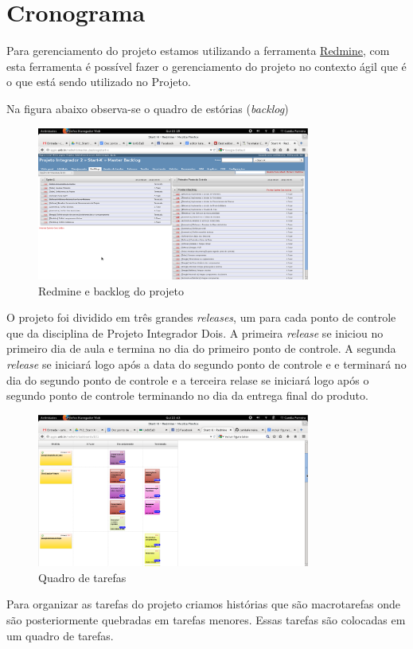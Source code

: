 \chapter[Cronograma]{Cronograma}

Para gerenciamento do projeto estamos utilizando a ferramenta \href{http://lappis.unb.br/redm}{Redmine}, com esta ferramenta é possível fazer o gerenciamento do projeto no contexto ágil que é o que está sendo utilizado no Projeto.

Na figura abaixo observa-se o quadro de estórias (\textit{backlog})
\begin{figure}[h]
  \centering
  \includegraphics[width=0.8\textwidth]
      {figuras/backlogs.eps}
  \caption{Redmine e backlog do projeto}
  \label{redmine-backlog}
\end{figure}

O projeto foi dividido em três grandes \textit{releases}, um para cada ponto de controle que da disciplina de Projeto Integrador Dois. A primeira \textit{release} se iniciou no primeiro dia de aula e termina no dia do primeiro ponto de controle. A segunda \textit{release} se iniciará logo após a data do segundo ponto de controle e e terminará no dia do segundo ponto de controle e a terceira relase se iniciará logo após o segundo ponto de controle terminando no dia da entrega final do produto.

\begin{figure}[h]
  \centering
  \includegraphics[width=0.8\textwidth]
      {figuras/quadrotarefas.eps}
  \caption{Quadro de tarefas}
  \label{quadro-de-tarefas}
\end{figure}
Para organizar as tarefas do projeto criamos histórias que são macrotarefas onde são posteriormente quebradas em tarefas menores. Essas tarefas são colocadas em um quadro de tarefas.


  
